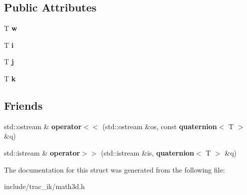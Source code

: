 \subsection*{Public Attributes}
\begin{DoxyCompactItemize}
\item 
T {\bfseries w}\label{structmath3d_1_1quaternion_a6a055ac4743a21b1e79918ab13d252cd}

\item 
T {\bfseries i}\label{structmath3d_1_1quaternion_a232b6f5a82ffd2cdc779731b86e7cb28}

\item 
T {\bfseries j}\label{structmath3d_1_1quaternion_ab2d084766b9edfc2cd179370027ebf9f}

\item 
T {\bfseries k}\label{structmath3d_1_1quaternion_ad645abbe05d6aaba9b32d983d93a467b}

\end{DoxyCompactItemize}
\subsection*{Friends}
\begin{DoxyCompactItemize}
\item 
std\-::ostream \& {\bfseries operator$<$$<$} (std\-::ostream \&os, const {\bf quaternion}$<$ T $>$ \&q)\label{structmath3d_1_1quaternion_a9bc3b039311e5571b40ffbdd339bdf22}

\item 
std\-::istream \& {\bfseries operator$>$$>$} (std\-::istream \&is, {\bf quaternion}$<$ T $>$ \&q)\label{structmath3d_1_1quaternion_a950b7d40654282e902fe113d9e4932ac}

\end{DoxyCompactItemize}


The documentation for this struct was generated from the following file\-:\begin{DoxyCompactItemize}
\item 
include/trac\-\_\-ik/math3d.\-h\end{DoxyCompactItemize}
